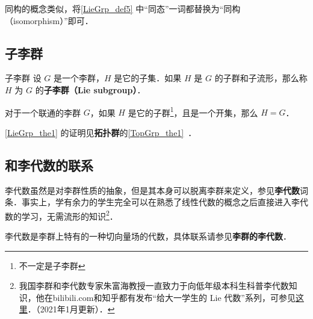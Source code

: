 同构的概念类似，将\autoref{LieGrp_def5} 中“同态”一词都替换为“同构（isomorphism）”即可．

\subsection{子李群}

\begin{definition}{子李群}
设 $G$ 是一个李群，$H$ 是它的子集．如果 $H$ 是 $G$ 的子群和子流形，那么称 $H$ 为 $G$ 的\textbf{子李群（Lie subgroup）}．
\end{definition}

\begin{theorem}{}\label{LieGrp_the1}
对于一个联通的李群 $G$，如果 $H$ 是它的子群\footnote{不一定是子李群}，且是一个开集，那么 $H=G$．
\end{theorem}

\autoref{LieGrp_the1} 的证明见\textbf{拓扑群}的\autoref{TopGrp_the1}~．

\subsection{和李代数的联系}

李代数虽然是对李群性质的抽象，但是其本身可以脱离李群来定义，参见\textbf{李代数}词条．事实上，学有余力的学生完全可以在熟悉了线性代数的概念之后直接进入李代数的学习，无需流形的知识\footnote{我国李群和李代数专家朱富海教授一直致力于向低年级本科生科普李代数知识，他在bilibili.com和知乎都有发布“给大一学生的 Lie 代数”系列，可参见\href{https://space.bilibili.com/509086270?from=search&seid=2394735306274350134和https://zhuanlan.zhihu.com/p/161735986}{这里}．（2021年1月更新）．}．

李代数是李群上特有的一种切向量场的代数，具体联系请参见\textbf{李群的李代数}．




